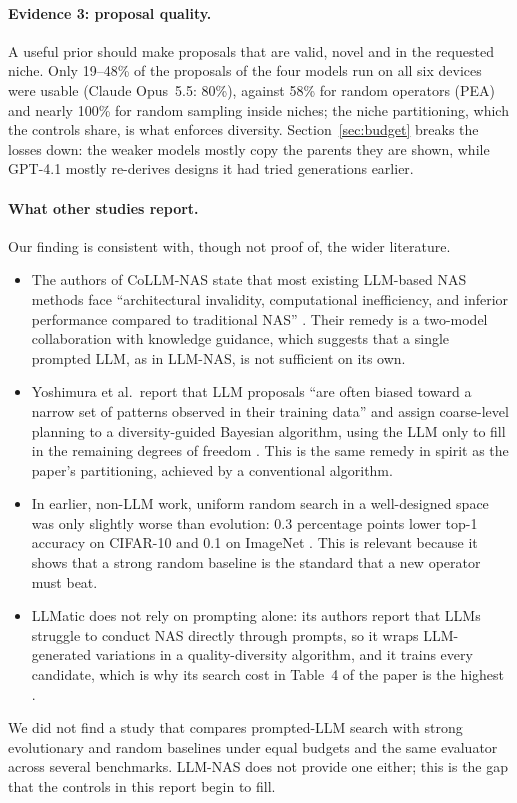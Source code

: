 \documentclass[11pt,a4paper]{article}
\begin{document}
\paragraph{Evidence 3: proposal quality.} A useful prior should make proposals that are valid, novel and in the requested niche. Only 19--48\% of the proposals of the four models run on all six devices were usable (Claude Opus~5.5: 80\%), against 58\% for random operators (PEA) and nearly 100\% for random sampling inside niches; the niche partitioning, which the controls share, is what enforces diversity. Section~\ref{sec:budget} breaks the losses down: the weaker models mostly copy the parents they are shown, while GPT-4.1 mostly re-derives designs it had tried generations earlier.

\paragraph{What other studies report.} Our finding is consistent with, though not proof of, the wider literature.
\begin{itemize}[nosep]
  \item The authors of CoLLM-NAS state that most existing LLM-based NAS methods face ``architectural invalidity, computational inefficiency, and inferior performance compared to traditional NAS'' \cite{collmnas}. Their remedy is a two-model collaboration with knowledge guidance, which suggests that a single prompted LLM, as in LLM-NAS, is not sufficient on its own.
  \item Yoshimura et al.\ report that LLM proposals ``are often biased toward a narrow set of patterns observed in their training data'' and assign coarse-level planning to a diversity-guided Bayesian algorithm, using the LLM only to fill in the remaining degrees of freedom \cite{llmtool}. This is the same remedy in spirit as the paper's partitioning, achieved by a conventional algorithm.
  \item In earlier, non-LLM work, uniform random search in a well-designed space was only slightly worse than evolution: 0.3 percentage points lower top-1 accuracy on CIFAR-10 and 0.1 on ImageNet \cite{hierarchical}. This is relevant because it shows that a strong random baseline is the standard that a new operator must beat.
  \item LLMatic does not rely on prompting alone: its authors report that LLMs struggle to conduct NAS directly through prompts, so it wraps LLM-generated variations in a quality-diversity algorithm, and it trains every candidate, which is why its search cost in Table~4 of the paper is the highest \cite{llmatic}.
\end{itemize}
We did not find a study that compares prompted-LLM search with strong evolutionary and random baselines under equal budgets and the same evaluator across several benchmarks. LLM-NAS does not provide one either; this is the gap that the controls in this report begin to fill.
\end{document}
